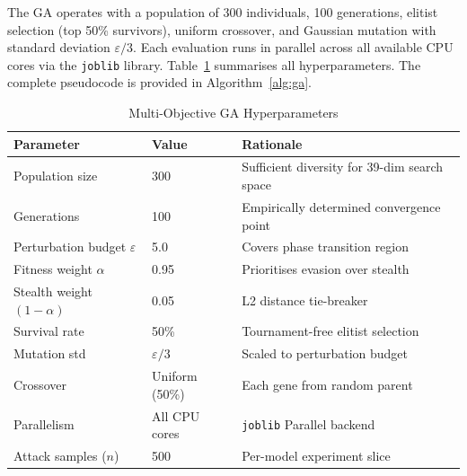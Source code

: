 \documentclass[review,12pt]{elsarticle}
\begin{document}
The GA operates with a population of 300 individuals, 100 generations, elitist selection (top 50\% survivors), uniform crossover, and Gaussian mutation with standard deviation $\varepsilon/3$. Each evaluation runs in parallel across all available CPU cores via the \texttt{joblib} library. Table~\ref{tab:ga_params} summarises all hyperparameters. The complete pseudocode is provided in Algorithm~\ref{alg:ga}.

\begin{table}[htbp]
\centering
\caption{Multi-Objective GA Hyperparameters}
\label{tab:ga_params}
\begin{tabular}{lll}
\toprule
\textbf{Parameter} & \textbf{Value} & \textbf{Rationale} \\
\midrule
Population size     & 300           & Sufficient diversity for 39-dim search space \\
Generations         & 100           & Empirically determined convergence point \\
Perturbation budget $\varepsilon$ & 5.0 & Covers phase transition region \\
Fitness weight $\alpha$ & 0.95      & Prioritises evasion over stealth \\
Stealth weight $(1-\alpha)$ & 0.05  & L2 distance tie-breaker \\
Survival rate       & 50\%          & Tournament-free elitist selection \\
Mutation std        & $\varepsilon/3$ & Scaled to perturbation budget \\
Crossover           & Uniform (50\%) & Each gene from random parent \\
Parallelism         & All CPU cores & \texttt{joblib} Parallel backend \\
Attack samples ($n$) & 500         & Per-model experiment slice \\
\bottomrule
\end{tabular}
\end{table}
\end{document}
